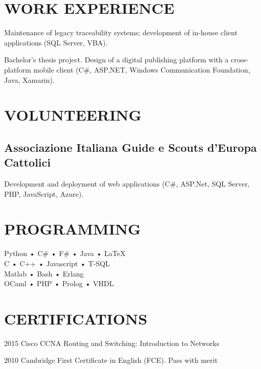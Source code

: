 \documentclass[a4paper]{deedy-resume-openfont}
\begin{document}
\begin{minipage}[t]{0.3\textwidth} 

\section{WORK EXPERIENCE} 

\vspace{\topsep} %
Maintenance of legacy traceability systems; development of in-house client applications (SQL Server, VBA).
\sectionsep%

\vspace{\topsep} %
Bachelor's thesis project.
Design of a digital publishing platform with a cross-platform mobile client (C\#, ASP.NET, Windows Communication Foundation, Java, Xamarin).
\sectionsep%

\section{VOLUNTEERING}

\subsection{Associazione Italiana Guide e Scouts d'Europa Cattolici}
\vspace{\topsep} %
Development and deployment of web applications
(C\#, ASP.Net, SQL Server, PHP, JavaScript, Azure).
\sectionsep%

\section{PROGRAMMING}
Python • C\# • F\# • Java • \LaTeX{}\\
C • C++ • Javascript • T-SQL\\ Matlab • Bash • Erlang \\
OCaml • PHP • Prolog • VHDL
\sectionsep%

\section{CERTIFICATIONS} 
\vspace{\topsep} %
\begin{tightemize}
\item[2015]    Cisco CCNA Routing and Switching: Introduction to Networks\\
\item[2010]    Cambridge First Certificate in English (FCE). Pass with merit\\
\end{tightemize}
\sectionsep%

\end{minipage} 
\end{document}
